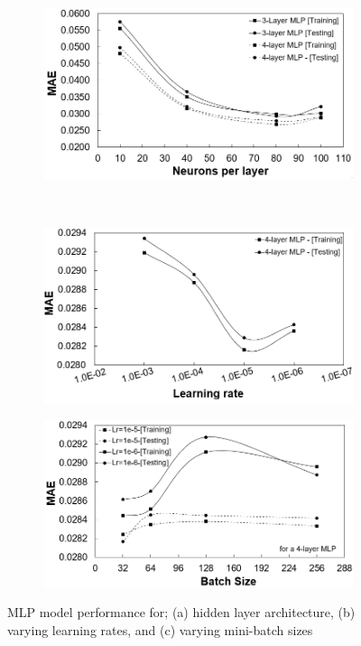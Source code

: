 \documentclass[a4paper,fleqn]{cas-dc}
\begin{document}
\begin{figure}[h!]
\centering
    \begin{subfigure}{0.5\textwidth}
    \includegraphics[width=1\textwidth]{NEURONS_HYPER}
    \caption{}
    \end{subfigure}\\
        \begin{subfigure}{0.5\textwidth}
    \includegraphics[width=1\textwidth]{LR_HYPER}
    \caption{}
    \end{subfigure}
        \begin{subfigure}{0.5\textwidth}
    \includegraphics[width=1\textwidth]{BATCH_SIZE_HYPER}
    \caption{}
    \end{subfigure}
    \caption{MLP model performance for; (a) hidden layer architecture, (b) varying learning rates, and (c) varying mini-batch sizes}\label{fig_mlp_hyper}
\end{figure}
\end{document}

